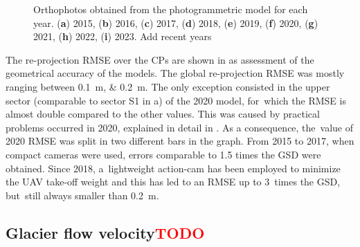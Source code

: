 \begin{figure}
{    }
    \caption{Orthophotos obtained from the photogrammetric model for each year.
        (\textbf{a}) 2015, (\textbf{b}) 2016, (\textbf{c}) 2017, (\textbf{d}) 2018,
        (\textbf{e})
        2019, (\textbf{f}) 2020, (\textbf{g}) 2021, (\textbf{h}) 2022, (\textbf{i})
        2023. {\color{red} Add recent years}}
    \label{fig:3:ortophoto}
\end{figure}

The re-projection RMSE over the CPs are shown in  as assessment
of the geometrical accuracy of the models.
The global re-projection RMSE was mostly ranging between \SIlist{0.1;0.2}{\meter}.
The only exception consisted in the {\color{red} upper sector (comparable to sector S1 in
a) of the 2020 model}, for~which the RMSE is almost double
compared to the other values.
{\color{red}
This was caused by practical problems occurred in 2020, explained in detail in
.
}
As a consequence, the~value of 2020 RMSE was split in two different bars in the graph.
From 2015 to 2017, when compact cameras were used, errors comparable to 1.5 times the GSD
were obtained.
Since 2018, a~lightweight action-cam has been employed to minimize the UAV take-off
weight and this has led to an RMSE up to 3~times the GSD, but~still always smaller than
\SI{0.2}{\meter}.

\subsection{Glacier flow velocity\textcolor{red}{TODO}}\label{sec:3:res:velocity}

